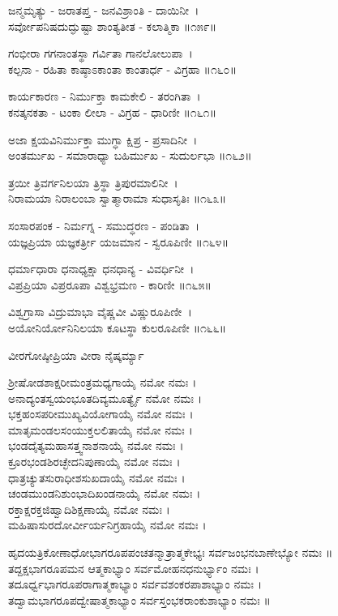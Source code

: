 ಜನ್ಮಮೃತ್ಯು - ಜರಾತಪ್ತ - ಜನವಿಶ್ರಾಂತಿ - ದಾಯಿನೀ~।\\
ಸರ್ವೋಪನಿಷದುದ್ಘುಷ್ಟಾ ಶಾಂತ್ಯತೀತ - ಕಲಾತ್ಮಿಕಾ ॥೧೫೯॥

ಗಂಭೀರಾ ಗಗನಾಂತಸ್ಥಾ ಗರ್ವಿತಾ ಗಾನಲೋಲುಪಾ~।\\
ಕಲ್ಪನಾ - ರಹಿತಾ ಕಾಷ್ಠಾಽಕಾಂತಾ ಕಾಂತಾರ್ಧ - ವಿಗ್ರಹಾ ॥೧೬೦॥

ಕಾರ್ಯಕಾರಣ - ನಿರ್ಮುಕ್ತಾ ಕಾಮಕೇಲಿ - ತರಂಗಿತಾ~।\\
ಕನತ್ಕನಕತಾ - ಟಂಕಾ ಲೀಲಾ - ವಿಗ್ರಹ - ಧಾರಿಣೀ ॥೧೬೧॥

ಅಜಾ ಕ್ಷಯವಿನಿರ್ಮುಕ್ತಾ ಮುಗ್ಧಾ ಕ್ಷಿಪ್ರ - ಪ್ರಸಾದಿನೀ~।\\
ಅಂತರ್ಮುಖ - ಸಮಾರಾಧ್ಯಾ ಬಹಿರ್ಮುಖ - ಸುದುರ್ಲಭಾ ॥೧೬೨॥

ತ್ರಯೀ ತ್ರಿವರ್ಗನಿಲಯಾ ತ್ರಿಸ್ಥಾ ತ್ರಿಪುರಮಾಲಿನೀ~।\\
ನಿರಾಮಯಾ ನಿರಾಲಂಬಾ ಸ್ವಾತ್ಮಾರಾಮಾ ಸುಧಾಸೃತಿಃ ॥೧೬೩॥

ಸಂಸಾರಪಂಕ - ನಿರ್ಮಗ್ನ - ಸಮುದ್ಧರಣ - ಪಂಡಿತಾ~।\\
ಯಜ್ಞಪ್ರಿಯಾ ಯಜ್ಞಕರ್ತ್ರೀ ಯಜಮಾನ - ಸ್ವರೂಪಿಣೀ ॥೧೬೪॥

ಧರ್ಮಾಧಾರಾ ಧನಾಧ್ಯಕ್ಷಾ ಧನಧಾನ್ಯ - ವಿವರ್ಧಿನೀ~।\\
ವಿಪ್ರಪ್ರಿಯಾ ವಿಪ್ರರೂಪಾ ವಿಶ್ವಭ್ರಮಣ - ಕಾರಿಣೀ ॥೧೬೫॥

ವಿಶ್ವಗ್ರಾಸಾ ವಿದ್ರುಮಾಭಾ ವೈಷ್ಣವೀ ವಿಷ್ಣುರೂಪಿಣೀ~।\\
ಅಯೋನಿರ್ಯೋನಿನಿಲಯಾ ಕೂಟಸ್ಥಾ ಕುಲರೂಪಿಣೀ ॥೧೬೬॥

ವೀರಗೋಷ್ಠೀಪ್ರಿಯಾ ವೀರಾ ನೈಷ್ಕರ್ಮ್ಯಾ 

ಶ್ರೀಷೋಡಶಾಕ್ಷರೀಮಂತ್ರಮಧ್ಯಗಾಯೈ ನಮೋ ನಮಃ ।\\
ಅನಾದ್ಯಂತಸ್ವಯಂಭೂತದಿವ್ಯಮೂರ್ತ್ಯೈ ನಮೋ ನಮಃ ।\\
ಭಕ್ತಹಂಸಪರೀಮುಖ್ಯವಿಯೋಗಾಯೈ ನಮೋ ನಮಃ ।\\
ಮಾತೃಮಂಡಲಸಂಯುಕ್ತಲಲಿತಾಯೈ ನಮೋ ನಮಃ ।\\
ಭಂಡದೈತ್ಯಮಹಾಸತ್ತ್ವನಾಶನಾಯೈ ನಮೋ ನಮಃ ।\\
ಕ್ರೂರಭಂಡಶಿರಚ್ಛೇದನಿಪುಣಾಯೈ ನಮೋ ನಮಃ ।\\
ಧಾತ್ರಚ್ಯುತಸುರಾಧೀಶಸುಖದಾಯೈ ನಮೋ ನಮಃ ।\\
ಚಂಡಮುಂಡನಿಶುಂಭಾದಿಖಂಡನಾಯೈ ನಮೋ ನಮಃ ।\\
ರಕ್ತಾಕ್ಷರಕ್ತಜಿಹ್ವಾದಿಶಿಕ್ಷಣಾಯೈ ನಮೋ ನಮಃ ।\\
ಮಹಿಷಾಸುರದೋರ್ವೀರ್ಯನಿಗ್ರಹಾಯೈ ನಮೋ ನಮಃ ।


ಹೃದಯತ್ರಿಕೋಣಾಧೋಭಾಗರೂಪಪಂಚತನ್ಮಾತ್ರಾತ್ಮಕೇಭ್ಯಃ ಸರ್ವಜಂಭನಬಾಣೇಭ್ಯೋ ನಮಃ ॥\\
ತದ್ದಕ್ಷಭಾಗರೂಪಮನ ಆತ್ಮಕಾಭ್ಯಾಂ ಸರ್ವಮೋಹನಧನುರ್ಭ್ಯಾಂ ನಮಃ ।\\
ತದೂರ್ಧ್ವಭಾಗರೂಪರಾಗಾತ್ಮಕಾಭ್ಯಾಂ ಸರ್ವವಶಂಕರಪಾಶಾಭ್ಯಾಂ ನಮಃ ।\\
ತದ್ವಾಮಭಾಗರೂಪದ್ವೇಷಾತ್ಮಕಾಭ್ಯಾಂ ಸರ್ವಸ್ತಂಭಕರಾಂಕುಶಾಭ್ಯಾಂ ನಮಃ ॥
